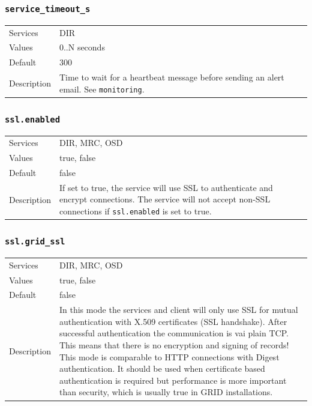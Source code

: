 \documentclass[a4paper,10pt]{book}
\begin{document}
\subsubsection{\texttt{service\_timeout\_s}}
\begin{tabular}{lp{10cm}}
 Services & DIR\\
 Values   & 0..N seconds \\
 Default  & 300 \\
 Description & Time to wait for a heartbeat message before sending an alert email. See \texttt{monitoring}.
\end{tabular}

\subsubsection{\texttt{ssl.enabled}}
\begin{tabular}{lp{10cm}}
 Services & DIR, MRC, OSD\\
 Values   & true, false \\
 Default  & false \\
 Description & If set to true, the service will use SSL to authenticate and encrypt connections. The service will not accept non-SSL connections if \texttt{ssl.enabled} is set to true.
\end{tabular}

\subsubsection{\texttt{ssl.grid\_ssl}}
\begin{tabular}{lp{10cm}}
 Services & DIR, MRC, OSD\\
 Values   & true, false \\
 Default  & false \\
 Description & In this mode the services and client will only use SSL for mutual authentication with X.509 certificates (SSL handshake). After successful authentication the communication is vai plain TCP. This means that there is no encryption and signing of records! This mode is comparable to HTTP connections with Digest authentication. It should be used when certificate based authentication is required but performance is more important than security, which is usually true in GRID installations.
\end{tabular}
\end{document}
